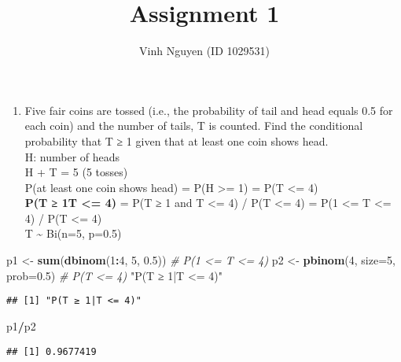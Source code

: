 \documentclass[]{article}
\title{Assignment 1}
\author{Vinh Nguyen (ID 1029531)}
\date{}
\newenvironment{Shaded}{\begin{snugshade}}{\end{snugshade}}
\newcommand{\CommentTok}[1]{\textcolor[rgb]{0.56,0.35,0.01}{\textit{#1}}}
\newcommand{\DataTypeTok}[1]{\textcolor[rgb]{0.13,0.29,0.53}{#1}}
\newcommand{\DecValTok}[1]{\textcolor[rgb]{0.00,0.00,0.81}{#1}}
\newcommand{\FloatTok}[1]{\textcolor[rgb]{0.00,0.00,0.81}{#1}}
\newcommand{\KeywordTok}[1]{\textcolor[rgb]{0.13,0.29,0.53}{\textbf{#1}}}
\newcommand{\NormalTok}[1]{#1}
\newcommand{\OperatorTok}[1]{\textcolor[rgb]{0.81,0.36,0.00}{\textbf{#1}}}
\newcommand{\StringTok}[1]{\textcolor[rgb]{0.31,0.60,0.02}{#1}}
\providecommand{\tightlist}{%
  \setlength{\itemsep}{0pt}\setlength{\parskip}{0pt}}
\begin{document}
\maketitle

\begin{enumerate}
\def\labelenumi{\arabic{enumi}.}
\tightlist
\item
  Five fair coins are tossed (i.e., the probability of tail and head
  equals 0.5 for each coin) and the number of tails, T is counted. Find
  the conditional probability that T ≥ 1 given that at least one coin
  shows head.\\
  H: number of heads\\
  H + T = 5 (5 tosses)\\
  P(at least one coin shows head) = P(H \textgreater{}= 1) = P(T
  \textless{}= 4)\\
  \textbf{P(T ≥ 1\textbar{}T \textless{}= 4)} = P(T ≥ 1 and T
  \textless{}= 4) / P(T \textless{}= 4) = P(1 \textless{}= T
  \textless{}= 4) / P(T \textless{}= 4)\\
  T \textasciitilde{} Bi(n=5, p=0.5)
\end{enumerate}

\begin{Shaded}
\begin{Highlighting}[]
\NormalTok{p1 <-}\StringTok{ }\KeywordTok{sum}\NormalTok{(}\KeywordTok{dbinom}\NormalTok{(}\DecValTok{1}\OperatorTok{:}\DecValTok{4}\NormalTok{, }\DecValTok{5}\NormalTok{, }\FloatTok{0.5}\NormalTok{)) }\CommentTok{# P(1 <= T <= 4)}
\NormalTok{p2 <-}\StringTok{ }\KeywordTok{pbinom}\NormalTok{(}\DecValTok{4}\NormalTok{, }\DataTypeTok{size=}\DecValTok{5}\NormalTok{, }\DataTypeTok{prob=}\FloatTok{0.5}\NormalTok{) }\CommentTok{# P(T <= 4)}
\StringTok{"P(T ≥ 1|T <= 4)"}
\end{Highlighting}
\end{Shaded}

\begin{verbatim}
## [1] "P(T ≥ 1|T <= 4)"
\end{verbatim}

\begin{Shaded}
\begin{Highlighting}[]
\NormalTok{p1}\OperatorTok{/}\NormalTok{p2}
\end{Highlighting}
\end{Shaded}

\begin{verbatim}
## [1] 0.9677419
\end{verbatim}
\end{document}
